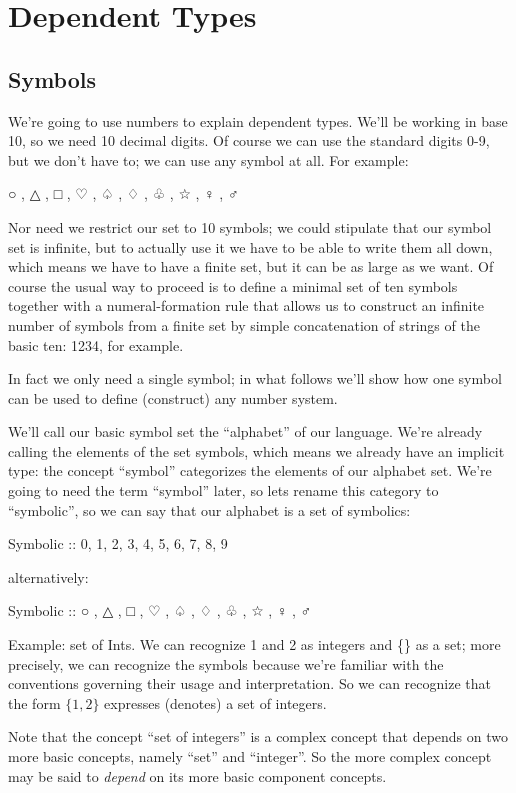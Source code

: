 \chapter{Dependent Types}

\section{Symbols}

We're going to use numbers to explain dependent types.  We'll be
working in base 10, so we need 10 decimal digits.  Of course we can
use the standard digits 0-9, but we don't have to; we can use any
symbol at all.  For example:

{ ○ , △ , □ , ♡ , ♤ , ♢ , ♧ , ☆ , ♀ , ♂ }


Nor need we restrict our set to 10 symbols; we could stipulate that
our symbol set is infinite, but to actually use it we have to be able
to write them all down, which means we have to have a finite set, but
it can be as large as we want.  Of course the usual way to proceed is
to define a minimal set of ten symbols together with a
numeral-formation rule that allows us to construct an infinite number
of symbols from a finite set by simple concatenation of strings of the
basic ten: 1234, for example.

In fact we only need a single symbol; in what follows we'll show how
one symbol can be used to define (construct) any number system.

We'll call our basic symbol set the ``alphabet'' of our language.
We're already calling the elements of the set symbols, which means we
already have an implicit type: the concept ``symbol'' categorizes the
elements of our alphabet set.  We're going to need the term ``symbol''
later, so lets rename this category to ``symbolic'', so we can say
that our alphabet is a set of symbolics:

Symbolic :: { 0, 1, 2, 3, 4, 5, 6, 7, 8, 9 }

alternatively:

Symbolic :: { ○ , △ , □ , ♡ , ♤ , ♢ , ♧ , ☆ , ♀ , ♂ }




Example: set of Ints.  We can recognize 1 and 2 as integers and \{\}
as a set; more precisely, we can recognize the symbols because we're
familiar with the conventions governing their usage and
interpretation.  So we can recognize that the form \( \{1, 2\}\)
expresses (denotes) a set of integers.

Note that the concept ``set of integers'' is a complex concept that
depends on two more basic concepts, namely ``set'' and ``integer''.
So the more complex concept may be said to \textit{depend} on its more
basic component concepts.

